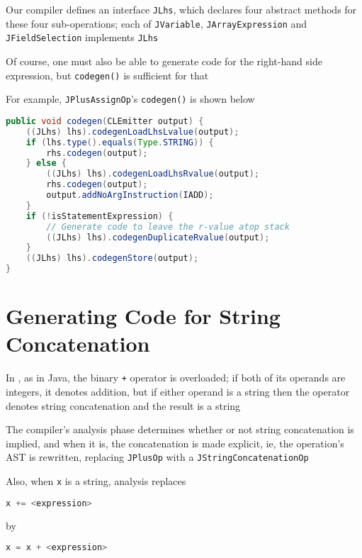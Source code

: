 \documentclass[8pt,a4paper,compress]{beamer}
\begin{document}
\begin{frame}[fragile]
\pause

Our compiler defines an interface \lstinline{JLhs}, which declares four abstract methods for these four sub-operations; each of \lstinline{JVariable}, \lstinline{JArrayExpression} and \lstinline{JFieldSelection} implements \lstinline{JLhs}

\pause
\bigskip

Of course, one must also be able to generate code for the right-hand side expression, but \lstinline{codegen()} is sufficient for that

\pause
\bigskip

For example, \lstinline{JPlusAssignOp}'s \lstinline{codegen()} is shown below
\begin{lstlisting}[language=Java]
public void codegen(CLEmitter output) {
    ((JLhs) lhs).codegenLoadLhsLvalue(output);
    if (lhs.type().equals(Type.STRING)) {
        rhs.codegen(output);
    } else {
        ((JLhs) lhs).codegenLoadLhsRvalue(output);
        rhs.codegen(output);
        output.addNoArgInstruction(IADD);
    }
    if (!isStatementExpression) {
        // Generate code to leave the r-value atop stack
        ((JLhs) lhs).codegenDuplicateRvalue(output);
    }
    ((JLhs) lhs).codegenStore(output);
}
\end{lstlisting}
\end{frame}

\section{Generating Code for String Concatenation}
\begin{frame}[fragile]
\pause

In \jmm, as in Java, the binary \lstinline{+} operator is overloaded; if both of its operands are integers, it denotes addition, but if either operand is a string then the operator denotes string concatenation and the result is a string

\pause
\bigskip

The compiler's analysis phase determines whether or not string concatenation is implied, and when it is, the concatenation is made explicit, ie, the operation's AST is rewritten, replacing \lstinline{JPlusOp} with a \lstinline{JStringConcatenationOp}

\pause
\bigskip

Also, when \lstinline{x} is a string, analysis replaces
\begin{lstlisting}[language=Java]
x += <expression>
\end{lstlisting}
by
\begin{lstlisting}[language=Java]
x = x + <expression>
\end{lstlisting}
\end{frame}
\end{document}
